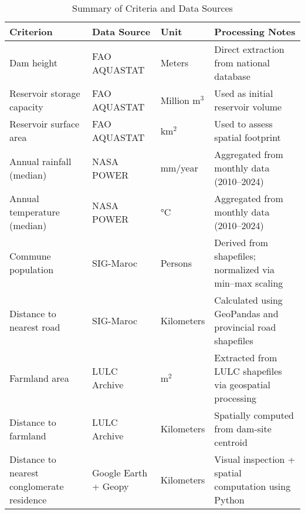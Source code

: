 \begin{table}[!ht]
\centering
\caption{Summary of Criteria and Data Sources}
\begin{tabular}{|p{4cm}|p{3.5cm}|p{2.5cm}|p{4cm}|}
\hline
\textbf{Criterion} & \textbf{Data Source} & \textbf{Unit} & \textbf{Processing Notes} \\
\hline
Dam height & FAO AQUASTAT \cite{FAO_AQUASTAT_MAR} & Meters & Direct extraction from national database \\
\hline
Reservoir storage capacity & FAO AQUASTAT \cite{FAO_AQUASTAT_MAR} & Million m$^3$ & Used as initial reservoir volume \\
\hline
Reservoir surface area & FAO AQUASTAT \cite{FAO_AQUASTAT_MAR} & km$^2$ & Used to assess spatial footprint \\
\hline
Annual rainfall (median) & NASA POWER \cite{NASA_POWER_API} & mm/year & Aggregated from monthly data (2010–2024) \\
\hline
Annual temperature (median) & NASA POWER \cite{NASA_POWER_API} & °C & Aggregated from monthly data (2010–2024) \\
\hline
Commune population & SIG-Maroc \cite{SIG_Maroc_Shapefiles} & Persons & Derived from shapefiles; normalized via min–max scaling \\
\hline
Distance to nearest road & SIG-Maroc \cite{SIG_Maroc_Shapefiles} & Kilometers & Calculated using GeoPandas and provincial road shapefiles \\
\hline
Farmland area & LULC Archive \cite{LULC_MegaArchive} & m$^2$ & Extracted from LULC shapefiles via geospatial processing \\
\hline
Distance to farmland & LULC Archive \cite{LULC_MegaArchive} & Kilometers & Spatially computed from dam-site centroid \\
\hline
Distance to nearest conglomerate residence & Google Earth + Geopy \cite{congloResidence2025} & Kilometers & Visual inspection + spatial computation using Python \\
\hline
\end{tabular}
\label{tab:data_sources}
\end{table}
